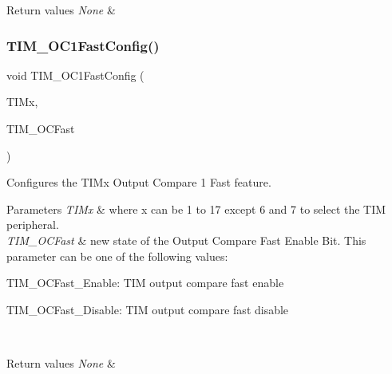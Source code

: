 \begin{DoxyRetVals}{Return values}
{\em None} & \\
\hline
\end{DoxyRetVals}
\mbox{\label{group___t_i_m___private___functions_gaec82031ca62f31f5483195c09752a83a}} 
\subsubsection{\texorpdfstring{TIM\_OC1FastConfig()}{TIM\_OC1FastConfig()}}
{\footnotesize\ttfamily void T\+I\+M\+\_\+\+O\+C1\+Fast\+Config (\begin{DoxyParamCaption}\item[{\mbox{\hyperlink{struct_t_i_m___type_def}{T\+I\+M\+\_\+\+Type\+Def}} $\ast$}]{T\+I\+Mx,  }\item[{uint16\+\_\+t}]{T\+I\+M\+\_\+\+O\+C\+Fast }\end{DoxyParamCaption})}



Configures the T\+I\+Mx Output Compare 1 Fast feature. 


\begin{DoxyParams}{Parameters}
{\em T\+I\+Mx} & where x can be 1 to 17 except 6 and 7 to select the T\+IM peripheral. \\
\hline
{\em T\+I\+M\+\_\+\+O\+C\+Fast} & new state of the Output Compare Fast Enable Bit. This parameter can be one of the following values\+: \begin{DoxyItemize}
\item T\+I\+M\+\_\+\+O\+C\+Fast\+\_\+\+Enable\+: T\+IM output compare fast enable \item T\+I\+M\+\_\+\+O\+C\+Fast\+\_\+\+Disable\+: T\+IM output compare fast disable \end{DoxyItemize}
\\
\hline
\end{DoxyParams}

\begin{DoxyRetVals}{Return values}
{\em None} & \\
\hline
\end{DoxyRetVals}
\mbox{\label{group___t_i_m___private___functions_gafcdb6ff00158862aef7fed5e7a554a3e}} 
